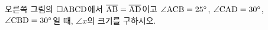 \noindent\begin{minipage}[t]{0.58\linewidth}\vspace{0pt}\raggedright 오른쪽 그림의 $\square\mathrm{ABCD}$에서 $\overline{\mathrm{AB}}=\overline{\mathrm{AD}}$이고 $\angle\mathrm{ACB}=25^\circ$, $\angle\mathrm{CAD}=30^\circ$, $\angle\mathrm{CBD}=30^\circ$일 때, $\angle x$의 크기를 구하시오.\end{minipage}\hfill\begin{minipage}[t]{0.4\linewidth}\vspace{0pt}\centering \resizebox{\ifdim\width>\linewidth\linewidth\else\width\fi}{!}{}\end{minipage}\par
